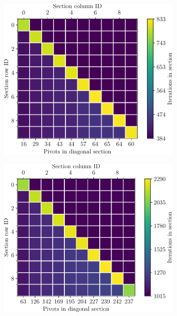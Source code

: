 \begin{figure}[ht!]
	\centering
	\begin{subfigure}[t]{0.48\textwidth}
		\centering
		\includegraphics[width=\textwidth, keepaspectratio]{images/ch03/input-matrices/decomposition-benchmarks/Cejka3839_icm32pp_metrics.pdf}
		\label{Figure:comparing-decomposers-and-solvers->decomposition-project-benchmarks->decomposers-benchmark->comparison-of-execution-times-on-subset-of-matrices->ICMxPP-metrics->Cejka3839}
	\end{subfigure}\hspace{0.03\textwidth}
	\begin{subfigure}[t]{0.48\textwidth}
		\centering
		\includegraphics[width=\textwidth, keepaspectratio, clip]{images/ch03/input-matrices/decomposition-benchmarks/Cejka10135_icm32pp_metrics.pdf}

\end{subfigure}
\end{figure}
